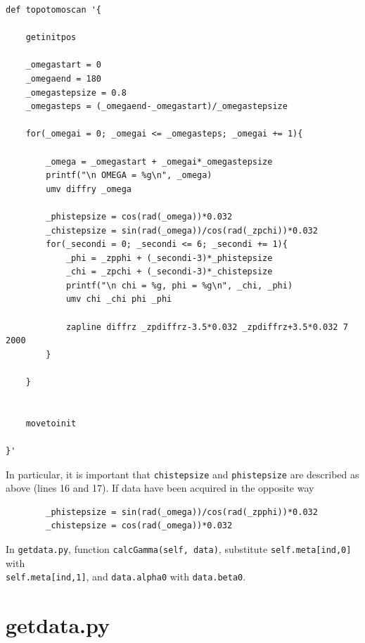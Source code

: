 \documentclass[11pt]{scrartcl}
\begin{document}
\begin{lstlisting}
def topotomoscan '{

    getinitpos
    
    _omegastart = 0
    _omegaend = 180
    _omegastepsize = 0.8
    _omegasteps = (_omegaend-_omegastart)/_omegastepsize

    for(_omegai = 0; _omegai <= _omegasteps; _omegai += 1){
        
        _omega = _omegastart + _omegai*_omegastepsize
        printf("\n OMEGA = %g\n", _omega)
        umv diffry _omega
        
        _phistepsize = cos(rad(_omega))*0.032
        _chistepsize = sin(rad(_omega))/cos(rad(_zpchi))*0.032
        for(_secondi = 0; _secondi <= 6; _secondi += 1){
            _phi = _zpphi + (_secondi-3)*_phistepsize
            _chi = _zpchi + (_secondi-3)*_chistepsize
            printf("\n chi = %g, phi = %g\n", _chi, _phi)
            umv chi _chi phi _phi
            
            zapline diffrz _zpdiffrz-3.5*0.032 _zpdiffrz+3.5*0.032 7 2000    
        }

    }
    
        
    movetoinit

}'
\end{lstlisting}

In particular, it is important that {\texttt{\textunderscore chistepsize}} and {\texttt{\textunderscore phistepsize}} are described as above (lines 16 and 17). If data have been acquired in the opposite way 

\begin{lstlisting}
        _phistepsize = sin(rad(_omega))/cos(rad(_zpphi))*0.032
        _chistepsize = cos(rad(_omega))*0.032
\end{lstlisting}

In {\texttt{getdata.py}}, function {\texttt{calcGamma(self, data)}}, substitute {\texttt{self.meta[ind,0]}} with \\ {\texttt{self.meta[ind,1]}}, and {\texttt{data.alpha0}} with {\texttt{data.beta0}}.

\section{getdata.py}
\label{sec:getdata}
\end{document}
